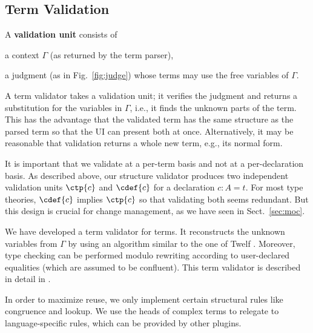 \subsection{Term Validation}\label{sec:tv}

A \textbf{validation unit} consists of
\begin{inparaenum}
  \item a context $\Gamma$ (as returned by the term parser),
  \item a judgment (as in Fig.~\ref{fig:judge}) whose terms may use the free variables of $\Gamma$.
\end{inparaenum}

A term validator takes a validation unit; it verifies the judgment and returns a substitution for the variables in $\Gamma$, i.e., it finds the unknown parts of the term.
This has the advantage that the validated term has the same structure as the parsed term so that the UI can present both at once.
Alternatively, it may be reasonable that validation returns a whole new term, e.g., its normal form.

It is important that we validate at a per-term basis and not at a per-declaration basis.
As described above, our structure validator produces two independent validation units $\ctp{c}$ and $\cdef{c}$ for a declaration $c:A=t$.
For most type theories, $\cdef{c}$ implies $\ctp{c}$ so that validating both seems redundant.
But this design is crucial for change management, as we have seen in Sect.~\ref{sec:moc}.

\begin{example}\label{ex:tv}
We have developed a term validator for \mmt terms.
It reconstructs the unknown variables from $\Gamma$ by using an algorithm similar to the one of Twelf \cite{twelf}.
Moreover, type checking can be performed modulo rewriting according to user-declared equalities (which are assumed to be confluent).
This term validator is described in detail in \cite{rabe:mmttypetheory:14}.

In order to maximize reuse, we only implement certain structural rules like congruence and lookup.
We use the heads of complex terms to relegate to language-specific rules, which can be provided by other plugins.
\end{example}

